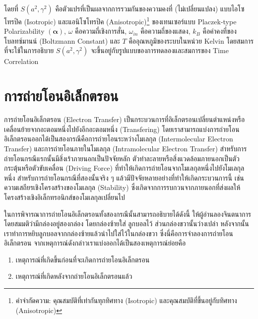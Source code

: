 \noindent โดยที่ $S(a^{2}, \gamma^{2})$ คือตัวแปรที่เป็นผลจากการรวมกันของความคงที่ (ไม่เปลี่ยนแปลง) แบบไอโซโทรปิค (Isotropic)
และแอนิโซโทรปิค (Anisotropic)\footnote{คำจำกัดความ: คุณสมบัติที่เท่ากันทุกทิศทาง (Isotropic) และคุณสมบัติที่ขึ้นอยู่กับทิศทาง
    (Anisotropic)} ของเทนเซอร์แบบ Placzek-type Polarizability $(\bm{\alpha})$\autocite{jensen2005}, $\omega$
คือความถี่เชิงการสั่น, $\omega_{in}$ คือความถี่ของแสดง, $k_{B}$ คือค่าคงที่ของโบลทซ์มานน์ (Boltzmann Constant) และ $T$
คืออุณหภูมิของระบบในหน่วย Kelvin โดยสมการที่จะใช้ในการอธิบาย $S(a^{2}, \gamma^{2})$ จะขึ้นอยู่กับรูปแบบของการทดลองและสมการของ
Time Correlation\autocite{mattiat2021}

\section{การถ่ายโอนอิเล็กตรอน}
\label{sec:et}

การถ่ายโอนอิเล็กตรอน (Electron Transfer) เป็นกระบวนการที่อิเล็กตรอนเปลี่ยนตำแหน่งหรือเคลื่อนย้ายจากอะตอมหนึ่งไปยังอีกอะตอมหนึ่ง
(Transfering) โดยเราสามารถแบ่งการถ่ายโอนอิเล็กตรอนออกได้เป็นสองกรณีคือการถ่ายโอนระหว่างโมเลกุล (Intermolecular Electron
Transfer) และการถ่ายโอนภายในโมเลกุล (Intramolecular Electron Transfer) สำหรับการถ่ายโอนกรณีแรกนั้นมีสิ่งเร้าภายนอกเป็นปัจจัยหลัก
ตัวทำละลายหรือสิ่งแวดล้อมภายนอกเป็นตัวกระตุ้นหรือตัวขับเคลื่อน (Driving Force) ที่ทำให้เกิดการถ่ายโอนจากโมเลกุลหนึ่งไปยังโมเลกุลหนึ่ง
สำหรับการถ่ายโอนกรณีที่สองนั้นจริง ๆ แล้วมีปัจจัยหลายอย่างที่ทำให้เกิดกระบวนการนี้ เช่น ความเสถียรเชิงโครงสร้างของโมเลกุล (Stability)
ซึ่งเกิดจากการรบกวนจากภายนอกที่ส่งผลให้โครงสร้างเชิงอิเล็กทรอนิกส์ของโมเลกุลเปลี่ยนไป

ในการพิจารณาการถ่ายโอนอิเล็กตรอนทั้งสองกรณีนั้นสามารถอธิบายได้ดังนี้ ให้ผู้อ่านลองจินตนาการโดยสมมติว่ามีกล่องอยู่สองกล่อง โดยกล่องซ้ายใส่%
ลูกบอลไว้ ส่วนกล่องขวานั้นว่างเปล่า หลังจากนั้นเราทำการหยิบลูกบอลจากกล่องซ้ายแล้วนำไปใส่ไว้ในกล่องขวา ซึ่งนี่คือการจำลองการถ่ายโอนอิเล็กตรอน
จากเหตุการณ์ดังกล่าวเราแบ่งออกได้เป็นสองเหตุการณ์ย่อยคือ
%
\begin{enumerate}[topsep=0pt,noitemsep]\setlength\itemsep{0.5em}
    \item เหตุการณ์ที่เกิดขึ้นก่อนที่จะเกิดการถ่ายโอนอิเล็กตรอน

    \item เหตุการณ์ที่เกิดหลังจากถ่ายโอนอิเล็กตรอนแล้ว
\end{enumerate}

